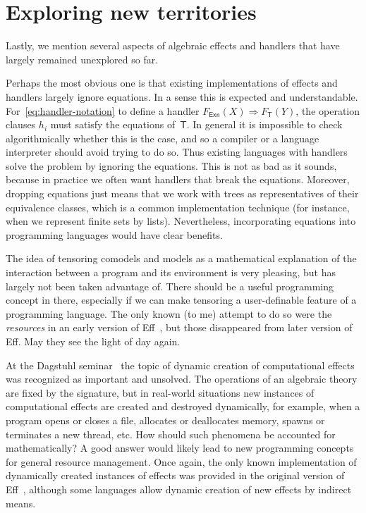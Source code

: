 \documentclass{amsart}
\newcommand{\theory}[1]{\mathsf{#1}} %
\newcommand{\Free}[2]{F_{\theory{#1}}(#2)} %
\newcommand{\hto}{\Rightarrow} %
\begin{document}
\section{Exploring new territories}
\label{sec:expl-new-terr}

Lastly, we mention several aspects of algebraic effects and handlers that have
largely remained unexplored so far.

Perhaps the most obvious one is that existing implementations of effects and
handlers largely ignore equations. In a sense this is expected and
understandable. For~\eqref{eq:handler-notation} to define a handler
$\Free{Exn}{X} \hto \Free{T}{Y}$, the operation clauses $h_i$ must satisfy the
equations of~$\theory{T}$. In general it is impossible to check algorithmically
whether this is the case, and so a compiler or a language interpreter should
avoid trying to do so. Thus existing languages with handlers solve the problem
by ignoring the equations. This is not as bad as it sounds, because in practice
we often want handlers that break the equations. Moreover, dropping equations
just means that we work with trees as representatives of their equivalence
classes, which is a common implementation technique (for instance, when we
represent finite sets by lists). Nevertheless, incorporating equations into
programming languages would have clear benefits.

The idea of tensoring comodels and models as a mathematical explanation of
the interaction between a program and its environment is very pleasing, but has
largely not been taken advantage of. There should be a useful programming
concept in there, especially if we can make tensoring a user-definable feature
of a programming language. The only known (to me) attempt to do so were the
\emph{resources} in an early version of Eff~\cite{bauer15:_progr}, but those
disappeared from later version of Eff. May they see the light of day again.

At the Dagstuhl seminar~\cite{chandrasekaran18:_algeb} the topic of dynamic
creation of computational effects was recognized as important and unsolved. The
operations of an algebraic theory are fixed by the signature, but in real-world
situations new instances of computational effects are created and destroyed
dynamically, for example, when a program opens or closes a file, allocates or
deallocates memory, spawns or terminates a new thread, etc. How should such
phenomena be accounted for mathematically? A good answer would likely lead to
new programming concepts for general resource management. Once again, the only
known implementation of dynamically created instances of effects was provided in
the original version of Eff~\cite{bauer15:_progr}, although some languages allow
dynamic creation of new effects by indirect means.




\end{document}
